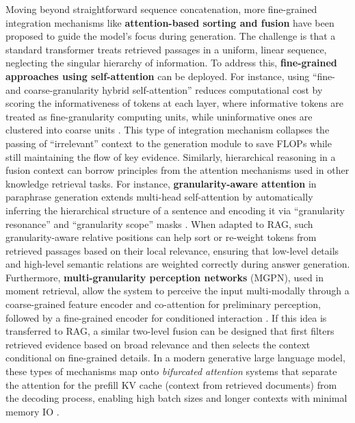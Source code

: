 \documentclass[11pt]{article}
\begin{document}
Moving beyond straightforward sequence concatenation, more fine-grained integration mechanisms like \textbf{attention-based sorting and fusion} have been proposed to guide the model's focus during generation. The challenge is that a standard transformer treats retrieved passages in a uniform, linear sequence, neglecting the singular hierarchy of information. To address this, \textbf{fine-grained approaches using self-attention} can be deployed. For instance, using ``fine- and coarse-granularity hybrid self-attention'' reduces computational cost by scoring the informativeness of tokens at each layer, where informative tokens are treated as fine-granularity computing units, while uninformative ones are clustered into coarse units \cite{ref40}. This type of integration mechanism collapses the passing of ``irrelevant'' context to the generation module to save FLOPs while still maintaining the flow of key evidence. Similarly, hierarchical reasoning in a fusion context can borrow principles from the attention mechanisms used in other knowledge retrieval tasks. For instance, \textbf{granularity-aware attention} in paraphrase generation extends multi-head self-attention by automatically inferring the hierarchical structure of a sentence and encoding it via ``granularity resonance'' and ``granularity scope'' masks \cite{ref41}. When adapted to RAG, such granularity-aware relative positions can help sort or re-weight tokens from retrieved passages based on their local relevance, ensuring that low-level details and high-level semantic relations are weighted correctly during answer generation. Furthermore, \textbf{multi-granularity perception networks} (MGPN), used in moment retrieval, allow the system to perceive the input multi-modally through a coarse-grained feature encoder and co-attention for preliminary perception, followed by a fine-grained encoder for conditioned interaction \cite{ref42}. If this idea is transferred to RAG, a similar two-level fusion can be designed that first filters retrieved evidence based on broad relevance and then selects the context conditional on fine-grained details. In a modern generative large language model, these types of mechanisms map onto \emph{bifurcated attention} systems that separate the attention for the prefill KV cache (context from retrieved documents) from the decoding process, enabling high batch sizes and longer contexts with minimal memory IO \cite{ref43}.
\end{document}
